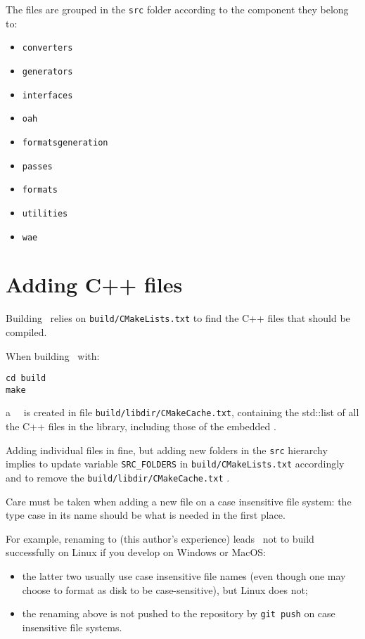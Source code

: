 The files are grouped in the {\tt src} folder according to the component they belong to:
\begin{itemize}
\item {\tt converters}
\item {\tt generators}
\item {\tt interfaces}
\item {\tt oah}
\item {\tt formatsgeneration}
\item {\tt passes}
\item {\tt formats}
\item {\tt utilities}
\item {\tt wae}
\end{itemize}


\section{Adding C++ files}

Building \mf\ relies on {\tt build/CMakeLists.txt} to find the C++ files that should be compiled.

When building \mf\ with:
\begin{lstlisting}[language=Terminal]
cd build
make
\end{lstlisting}
a \cmake\ \cache\ is created in file {\tt build/libdir/CMakeCache.txt}, containing the std::list of all the C++ files in the library, including those of the embedded \libmusicxml.

Adding individual files in fine, but adding new folders in the {\tt src} hierarchy implies to update variable {\tt SRC_FOLDERS} in {\tt build/CMakeLists.txt} accordingly and to remove the {\tt build/libdir/CMakeCache.txt} \cache.

Care must be taken when adding a new file on a case insensitive file system: the type case in its name should be what is needed in the first place.

For example, renaming  to  (this author's experience) leads \mf\ not to build successfully on Linux if you develop on Windows or MacOS:
\begin{itemize}
\item the latter two usually use case insensitive file names (even though one may choose to format as disk to be case-sensitive), but Linux does not;
\item the renaming above is not pushed to the repository by {\tt git push} on case insensitive file systems.
\end{itemize}

